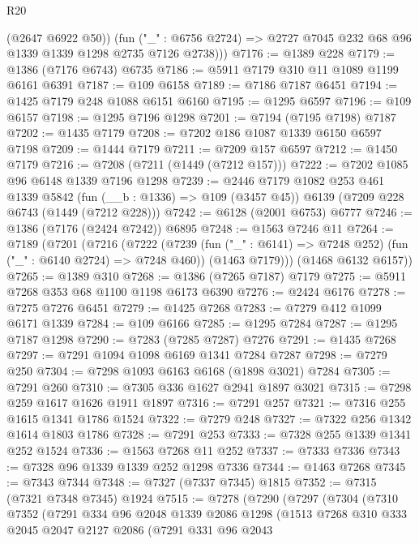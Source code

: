 \begin{lexlean}{R20}
\begin{coremodule}
          (@2647 @6922 @50))
        (fun ("_" : @6756 @2724) => @2727 @7045 @232 @68 @96 @1339 @1339 @1298 @2735 @7126 @2738)))
@7176 := @1389 @228
@7179 := @1386 (@7176 @6743) @6735
@7186 := @5911 @7179 @310 @11 @1089 @1199 @6161 @6391
@7187 := @109 @6158
@7189 := @7186 @7187 @6451
@7194 := @1425 @7179 @248 @1088 @6151 @6160
@7195 := @1295 @6597
@7196 := @109 @6157
@7198 := @1295 @7196 @1298
@7201 := @7194 (@7195 @7198) @7187
@7202 := @1435 @7179
@7208 := @7202 @186 @1087 @1339 @6150 @6597 @7198
@7209 := @1444 @7179
@7211 := @7209 @157 @6597
@7212 := @1450 @7179
@7216 := @7208 (@7211 (@1449 (@7212 @157)))
@7222 := @7202 @1085 @96 @6148 @1339 @7196 @1298
@7239 := @2446
    @7179
    @1082
    @253
    @461
    @1339
    @5842
    (fun (__b : @1336) => @109 (@3457 @45))
    @6139
    (@7209 @228 @6743 (@1449 (@7212 @228)))
@7242 := @6128 (@2001 @6753) @6777
@7246 := @1386 (@7176 (@2424 @7242)) @6895
@7248 := @1563 @7246 @11
@7264 := @7189
    (@7201
      (@7216
        (@7222
          (@7239 (fun ("_" : @6141) => @7248 @252) (fun ("_" : @6140 @2724) => @7248 @460))
          (@1463 @7179)))
      (@1468 @6132 @6157))
@7265 := @1389 @310
@7268 := @1386 (@7265 @7187) @7179
@7275 := @5911 @7268 @353 @68 @1100 @1198 @6173 @6390
@7276 := @2424 @6176
@7278 := @7275 @7276 @6451
@7279 := @1425 @7268
@7283 := @7279 @412 @1099 @6171 @1339
@7284 := @109 @6166
@7285 := @1295 @7284
@7287 := @1295 @7187 @1298
@7290 := @7283 (@7285 @7287) @7276
@7291 := @1435 @7268
@7297 := @7291 @1094 @1098 @6169 @1341 @7284 @7287
@7298 := @7279 @250
@7304 := @7298 @1093 @6163 @6168 (@1898 @3021) @7284
@7305 := @7291 @260
@7310 := @7305 @336 @1627 @2941 @1897 @3021
@7315 := @7298 @259 @1617 @1626 @1911 @1897
@7316 := @7291 @257
@7321 := @7316 @255 @1615 @1341 @1786 @1524
@7322 := @7279 @248
@7327 := @7322 @256 @1342 @1614 @1803 @1786
@7328 := @7291 @253
@7333 := @7328 @255 @1339 @1341 @252 @1524
@7336 := @1563 @7268 @11 @252
@7337 := @7333 @7336
@7343 := @7328 @96 @1339 @1339 @252 @1298 @7336
@7344 := @1463 @7268
@7345 := @7343 @7344
@7348 := @7327 (@7337 @7345) @1815
@7352 := @7315 (@7321 @7348 @7345) @1924
@7515 := @7278
    (@7290
      (@7297
        (@7304
          (@7310
            @7352
            (@7291
              @334
              @96
              @2048
              @1339
              @2086
              @1298
              (@1513
                @7268
                @310
                @333
                @2045
                @2047
                @2127
                @2086
                (@7291
                  @331
                  @96
                  @2043

\end{coremodule}
\end{lexlean}
